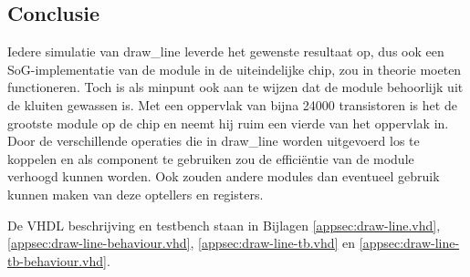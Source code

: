 \documentclass{scrartcl} %
\begin{document}
\subsection{Conclusie}
Iedere simulatie van draw\_line leverde het gewenste resultaat op, dus ook een SoG-implementatie van de module in de uiteindelijke chip, zou in theorie moeten functioneren. Toch is als minpunt ook aan te wijzen dat de module behoorlijk uit de kluiten gewassen is. Met een oppervlak van bijna 24000 transistoren is het de grootste module op de chip en neemt hij ruim een vierde van het oppervlak in. Door de verschillende operaties die in draw\_line worden uitgevoerd los te koppelen en als component te gebruiken zou de efficiëntie van de module verhoogd kunnen worden. Ook zouden andere modules dan eventueel gebruik kunnen maken van deze optellers en registers.

De VHDL beschrijving en testbench staan in Bijlagen \ref{appsec:draw-line.vhd}, \ref{appsec:draw-line-behaviour.vhd}, \ref{appsec:draw-line-tb.vhd} en \ref{appsec:draw-line-tb-behaviour.vhd}.
\end{document}
